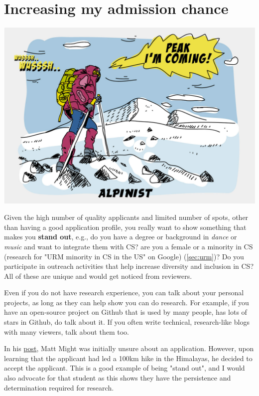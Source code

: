 \documentclass[oneside,11pt,dvipsnames]{book}
\begin{document}
\section{Increasing my admission chance}\label{sec:improve-your-chance}

\begin{center}
  \includegraphics[scale=0.2]{files/alpinist-climbing-peak-mountain-comic-hand-drawn-vector-illustration.jpg}
\end{center}


Given the high number of quality applicants and limited number of spots, other than having a good application profile, you really want to show something that makes you \textbf{stand out}, e.g., do you have a degree or background in \emph{dance} or \emph{music} and want to integrate them with CS? are you a female or a minority in CS (research for "URM minority in CS in the US" on Google) (\autoref{sec:urm})? Do you participate in outreach activities that help increase diversity and inclusion in CS? All of these are unique and would get noticed from reviewers.

Even if you do not have research experience, you can talk about your personal projects, as long as they can help show you can do research. For example, if you have an open-source project on Github that is used by many people, has lots of stars in Github, do talk about it. If you often write technical, research-like blogs with many viewers, talk about them too.


In his \href{https://matt.might.net/articles/how-to-apply-and-get-in-to-graduate-school-in-science-mathematics-engineering-or-computer-science/}{post}, Matt Might was initially unsure about an application. However, upon learning that the applicant had led a 100km hike in the Himalayas, he decided to accept the applicant.  This is a good example of being "stand out", and I would also advocate for that student as this shows they have the persistence and determination required for research.
\end{document}
